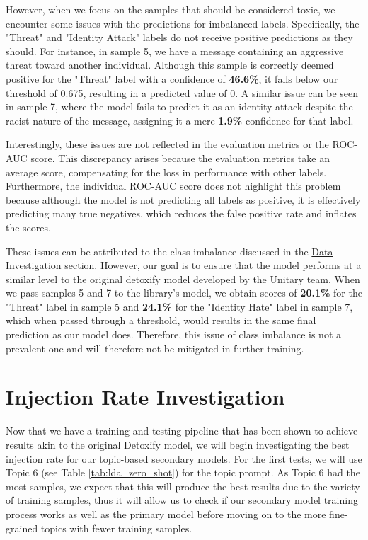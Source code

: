 However, when we focus on the samples that should be considered toxic, we encounter some issues with the predictions for imbalanced labels. Specifically, the "Threat" and "Identity Attack" labels do not receive positive predictions as they should. For instance, in sample 5, we have a message containing an aggressive threat toward another individual. Although this sample is correctly deemed positive for the "Threat" label with a confidence of \textbf{46.6\%}, it falls below our threshold of 0.675, resulting in a predicted value of 0. A similar issue can be seen in sample 7, where the model fails to predict it as an identity attack despite the racist nature of the message, assigning it a mere \textbf{1.9\%} confidence for that label.

Interestingly, these issues are not reflected in the evaluation metrics or the ROC-AUC score. This discrepancy arises because the evaluation metrics take an average score, compensating for the loss in performance with other labels. Furthermore, the individual ROC-AUC score does not highlight this problem because although the model is not predicting all labels as positive, it is effectively predicting many true negatives, which reduces the false positive rate and inflates the scores.

These issues can be attributed to the class imbalance discussed in the \hyperref[label_imbalance]{Data Investigation} section. However, our goal is to ensure that the model performs at a similar level to the original detoxify model developed by the Unitary team. When we pass samples 5 and 7 to the library's model, we obtain scores of \textbf{20.1\%} for the "Threat" label in sample 5 and \textbf{24.1\%} for the "Identity Hate" label in sample 7, which when passed through a threshold, would results in the same final prediction as our model does. Therefore, this issue of class imbalance is not a prevalent one and will therefore not be mitigated in further training.

\section{Injection Rate Investigation}

Now that we have a training and testing pipeline that has been shown to achieve results akin to the original Detoxify model, we will begin investigating the best injection rate for our topic-based secondary models. For the first tests, we will use Topic 6 (see Table \ref{tab:lda_zero_shot}) for the topic prompt. As Topic 6 had the most samples, we expect that this will produce the best results due to the variety of training samples, thus it will allow us to check if our secondary model training process works as well as the primary model before moving on to the more fine-grained topics with fewer training samples.

